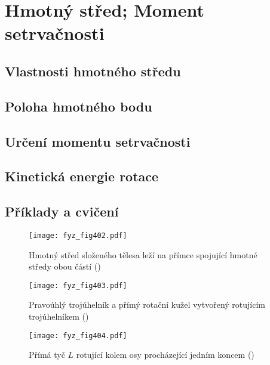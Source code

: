 \setchaptertoc
\chapter{Hmotný střed; Moment setrvačnosti}\label{fyz:IchapXIX}

  \section{Vlastnosti hmotného středu}\label{fyz:IchapXIXsecI}
  \section{Poloha hmotného bodu}\label{fyz:IchapXIXsecII}
  \section{Určení momentu setrvačnosti}\label{fyz:IchapXIXsecIII}
  \section{Kinetická energie rotace}\label{fyz:IchapXIXsecIV}
  \section{Příklady a cvičení}\label{fyz:IchapXIXsecV}

  \begin{figure}[ht!] %
    \centering
    \texttt{[image: fyz\_fig402.pdf]}
    \caption{Hmotný střed složeného tělesa leží na přímce spojující hmotné středy obou částí
             (\cite[s.~260]{Feynman01})}
    \label{fyz:fig402}
  \end{figure}

  \begin{figure}[ht!] %
    \centering
    \texttt{[image: fyz\_fig403.pdf]}
    \caption{Pravoúhlý trojúhelník a přímý rotační kužel vytvořený rotujícím trojúhelníkem 
             (\cite[s.~263]{Feynman01})}
    \label{fyz:fig403}
  \end{figure}
  \begin{figure}[ht!] %
    \centering
    \texttt{[image: fyz\_fig404.pdf]}
    \caption{Přímá tyč \(L\) rotující kolem osy procházející jedním koncem
             (\cite[s.~264]{Feynman01})}
    \label{fyz:fig404}
  \end{figure}


